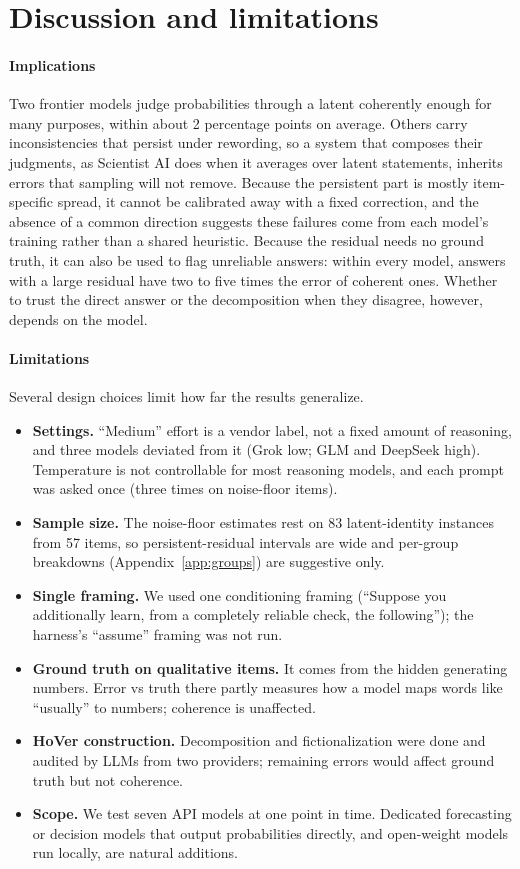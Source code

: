 \documentclass[11pt]{article}
\begin{document}
\section{Discussion and limitations}

\paragraph{Implications} Two frontier models judge probabilities through a latent coherently enough for many purposes, within about 2 percentage points on average. Others carry inconsistencies that persist under rewording, so a system that composes their judgments, as Scientist AI does when it averages over latent statements, inherits errors that sampling will not remove. Because the persistent part is mostly item-specific spread, it cannot be calibrated away with a fixed correction, and the absence of a common direction suggests these failures come from each model's training rather than a shared heuristic. Because the residual needs no ground truth, it can also be used to flag unreliable answers: within every model, answers with a large residual have two to five times the error of coherent ones. Whether to trust the direct answer or the decomposition when they disagree, however, depends on the model.

\paragraph{Limitations} Several design choices limit how far the results generalize.
\begin{itemize}
\item \textbf{Settings.} ``Medium'' effort is a vendor label, not a fixed amount of reasoning, and three models deviated from it (Grok low; GLM and DeepSeek high). Temperature is not controllable for most reasoning models, and each prompt was asked once (three times on noise-floor items).
\item \textbf{Sample size.} The noise-floor estimates rest on 83 latent-identity instances from 57 items, so persistent-residual intervals are wide and per-group breakdowns (Appendix~\ref{app:groups}) are suggestive only.
\item \textbf{Single framing.} We used one conditioning framing (``Suppose you additionally learn, from a completely reliable check, the following''); the harness's ``assume'' framing was not run.
\item \textbf{Ground truth on qualitative items.} It comes from the hidden generating numbers. Error vs truth there partly measures how a model maps words like ``usually'' to numbers; coherence is unaffected.
\item \textbf{HoVer construction.} Decomposition and fictionalization were done and audited by LLMs from two providers; remaining errors would affect ground truth but not coherence.
\item \textbf{Scope.} We test seven API models at one point in time. Dedicated forecasting or decision models that output probabilities directly, and open-weight models run locally, are natural additions.
\end{itemize}
\end{document}
